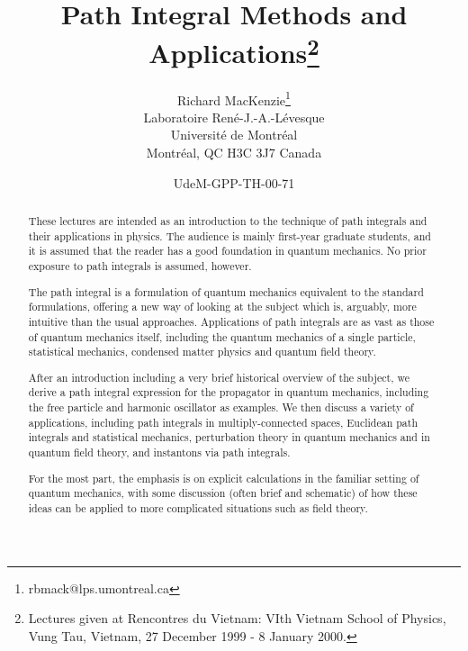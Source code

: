 \documentclass[12pt]{article}
\begin{document}
\newcommand\tdot[1]{\mathord{\mathop{#1}\limits^{\kern2pt\ldots}}}

%
%



\title{Path Integral Methods and Applications\thanks{Lectures given at
    Rencontres du Vietnam: VIth Vietnam School of Physics, Vung Tau,
    Vietnam, 27 December 1999 - 8 January 2000.}}
\author{Richard MacKenzie\thanks{rbmack@lps.umontreal.ca}\\
Laboratoire Ren\'e-J.-A.-L\'evesque\\
Universit\'e de Montr\'eal\\
Montr\'eal, QC H3C 3J7 Canada}
\date{\normalsize UdeM-GPP-TH-00-71}
\maketitle
\begin{abstract} These lectures are intended as an introduction to the
  technique of path integrals and their applications in physics. The
  audience is mainly first-year graduate students, and it is assumed
  that the reader has a good foundation in quantum mechanics. No prior
  exposure to path integrals is assumed, however.

  The path integral is a formulation of quantum mechanics equivalent
  to the standard formulations, offering a new way of looking at
  the subject which is, arguably, more intuitive than the usual
  approaches. Applications of path integrals are as vast as those of
  quantum mechanics itself, including the quantum mechanics of a
  single particle, statistical mechanics, condensed matter physics and
  quantum field theory.

After an introduction including a very brief historical overview of
  the subject, we derive a path integral expression for the propagator
  in quantum mechanics, including the free particle and harmonic
  oscillator as examples. We then discuss a variety of applications,
  including path integrals in multiply-connected spaces, Euclidean
  path integrals and statistical mechanics, perturbation theory in
  quantum mechanics and in quantum field theory, and instantons via
  path integrals.

For the most part, the emphasis is on explicit calculations in the
  familiar setting of quantum mechanics, with some discussion (often
  brief and schematic) of how these ideas can be applied to more
  complicated situations such as field theory.
\end{abstract}
\end{document}
